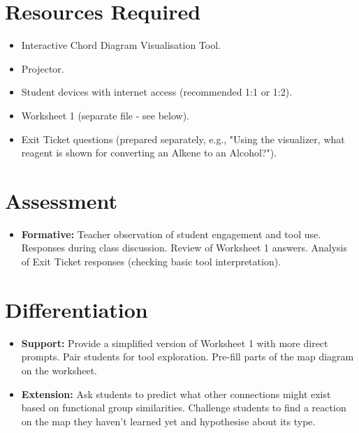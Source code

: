 \documentclass[11pt, a4paper]{article}
\begin{document}
\section*{Resources Required}
\begin{itemize}
    \item Interactive Chord Diagram Visualisation Tool.
    \item Projector.
    \item Student devices with internet access (recommended 1:1 or 1:2).
    \item Worksheet 1 (separate file - see below).
    \item Exit Ticket questions (prepared separately, e.g., "Using the visualizer, what reagent is shown for converting an Alkene to an Alcohol?").
\end{itemize}

\section*{Assessment}
\begin{itemize}
    \item \textbf{Formative:} Teacher observation of student engagement and tool use. Responses during class discussion. Review of Worksheet 1 answers. Analysis of Exit Ticket responses (checking basic tool interpretation).
\end{itemize}

\section*{Differentiation}
\begin{itemize}
    \item \textbf{Support:} Provide a simplified version of Worksheet 1 with more direct prompts. Pair students for tool exploration. Pre-fill parts of the map diagram on the worksheet.
    \item \textbf{Extension:} Ask students to predict what other connections might exist based on functional group similarities. Challenge students to find a reaction on the map they haven't learned yet and hypothesise about its type.
\end{itemize}
\end{document}
